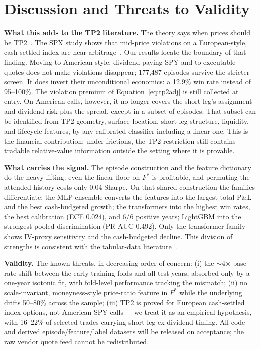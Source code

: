 \documentclass[sigconf,review,anonymous]{acmart}
\begin{document}
\section{Discussion and Threats to Validity}
\label{sec:limitations}

\noindent\textbf{What this adds to the TP2 literature.} The theory says when prices should be TP2~\cite{glasserman2026tp2theory}. The SPX study shows that mid-price violations on a European-style, cash-settled index are near-arbitrage~\cite{glasserman2025tp2}. Our results locate the boundary of that finding. Moving to American-style, dividend-paying SPY and to executable quotes does not make violations disappear; 177{,}487 episodes survive the stricter screen. It does invert their unconditional economics: a 12.9\% win rate instead of 95--100\%. The violation premium of Equation~\eqref{eq:tp2adj} is still collected at entry. On American calls, however, it no longer covers the short leg's assignment and dividend risk plus the spread, except in a subset of episodes. That subset can be identified from TP2 geometry, surface location, short-leg structure, liquidity, and lifecycle features, by any calibrated classifier including a linear one. This is the financial contribution: under frictions, the TP2 restriction still contains tradable relative-value information outside the setting where it is provable.

\noindent\textbf{What carries the signal.} The episode construction and the feature dictionary do the heavy lifting: even the linear floor on $F^{\ast}$ is profitable, and permuting the attended history costs only 0.04 Sharpe. On that shared construction the families differentiate: the MLP ensemble converts the features into the largest total P\&L and the best cash-budgeted growth; the transformers into the highest win rates, the best calibration (ECE 0.024), and 6/6 positive years; LightGBM into the strongest pooled discrimination (PR-AUC 0.492). Only the transformer family shows IV-proxy sensitivity and the cash-budgeted decline. This division of strengths is consistent with the tabular-data literature~\cite{grinsztajn2022why,gorishniy2021revisiting}.

\noindent\textbf{Validity.} The known threats, in decreasing order of concern: (i) the $\sim$4$\times$ base-rate shift between the early training folds and all test years, absorbed only by a one-year isotonic fit, with fold-level performance tracking the mismatch; (ii) no scale-invariant, moneyness-style price-ratio feature in $F^{\ast}$ while the underlying drifts 50--80\% across the sample; (iii) TP2 is proved for European cash-settled index options, not American SPY calls~\cite{glasserman2026tp2theory,cosma2020earlyexercise}---we treat it as an empirical hypothesis, with 16--22\% of selected trades carrying short-leg ex-dividend timing. All code and derived episode/feature/label datasets will be released on acceptance; the raw vendor quote feed cannot be redistributed.
\end{document}
